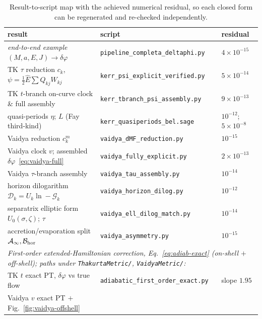 \documentclass[12pt]{iopart}
\newcommand{\Ehat}{\hat E}
\begin{document}
\begin{table}[htbp]
    \centering
    \caption{Result-to-script map with the achieved numerical residual, so each
    closed form can be regenerated and re-checked independently.}
    \label{tab:script-map}
    \begin{tabular}{lll}
        \hline\hline
        result & script & residual\\
        \hline
        \emph{end-to-end example} $(M,a,E,J)\!\to\!\delta\varphi$
            & \texttt{pipeline\_completa\_deltaphi.py} & $4\times10^{-15}$\\
        TK $\tau$ reduction $c_k$, $\psi=\tfrac12\Ehat\sum Q_{kj}W_{kj}$
            & \texttt{kerr\_psi\_explicit\_verified.py} & $5\times10^{-14}$\\
        TK $t$-branch on-curve clock \& full assembly
            & \texttt{kerr\_tbranch\_psi\_assembly.py} & $9\times10^{-13}$\\
        quasi-periods $\eta$; $L$ (Fay third-kind)
            & \texttt{kerr\_quasiperiods\_bel.sage} & $10^{-12}$; $5\times10^{-8}$\\
        Vaidya reduction $c_k^m$
            & \texttt{vaidya\_dMF\_reduction.py} & $10^{-15}$\\
        Vaidya clock $v$; assembled $\delta\varphi$~\eqref{eq:vaidya-full}
            & \texttt{vaidya\_fully\_explicit.py} & $2\times10^{-13}$\\
        Vaidya $\tau$-branch assembly
            & \texttt{vaidya\_tau\_assembly.py} & $10^{-14}$\\
        horizon dilogarithm $\mathcal{D}_k=U_k\ln-\mathcal{G}_k$
            & \texttt{vaidya\_horizon\_dilog.py} & $10^{-12}$\\
        separatrix elliptic form $U_0(\sigma,\zeta)$; $\tau$
            & \texttt{vaidya\_ell\_dilog\_match.py} & $10^{-14}$\\
        accretion/evaporation split $\mathcal{A}_\infty,\mathcal{B}_{\rm hor}$
            & \texttt{vaidya\_asymmetry.py} & $10^{-15}$\\
        \hline
        \multicolumn{3}{l}{\emph{First-order extended-Hamiltonian correction,
            Eq.~\eqref{eq:adiab-exact} (on-shell $+$ off-shell); paths under
            \texttt{ThakurtaMetric/}, \texttt{VaidyaMetric/}:}}\\
        TK $t$ exact PT, $\delta\varphi$ vs true flow
            & \texttt{adiabatic\_first\_order\_exact.py} & slope $1.95$\\
        Vaidya $v$ exact PT $+$ Fig.~\ref{fig:vaidya-offshell}

\end{tabular}
\end{table}
\end{document}
